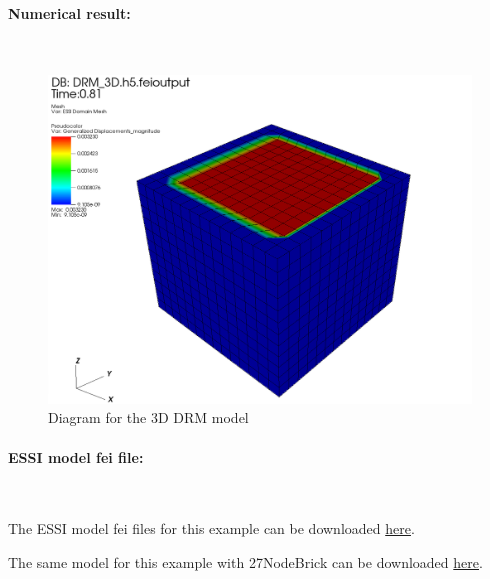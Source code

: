\documentclass[fleqn,11pt]{article}
\begin{document}




\paragraph{Numerical result:} ~

\begin{figure}[H]
  \centering
  \includegraphics[width=15cm]{../Figure-files/3d_drm_result429.png}
  \caption{Diagram for the 3D DRM model}
  \label{fig Diagram for the 3D DRM model}
\end{figure}


\paragraph{ESSI model fei file: } ~



The ESSI model fei files for this example can be downloaded \href{https://github.com/yuan-energy/Real-ESSI-Examples/blob/master/model_fei_file/8NodeBrick_DRM_3D/8NodeBrick_DRM_3D.tgz?raw=true}{here}.

The same model for this example with 27NodeBrick can be downloaded \href{https://github.com/yuan-energy/Real-ESSI-Examples/blob/master/model_fei_file/27NodeBrick_DRM_3D/27NodeBrick_DRM_3D.tgz?raw=true}{here}.
\end{document}
